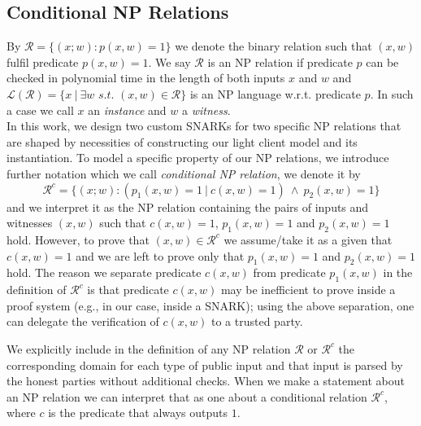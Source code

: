 \subsection{Conditional NP Relations}
\label{sec:conditional_relations}
\noindent By $\mathcal{R} =\{(x;w): p(x,w) = 1 \}$ we denote the binary relation such that $(x,w)$ 
fulfil predicate $p(x,w) = 1$. We say $\mathcal{R}$ is an NP relation if predicate $p$ can be checked in polynomial 
time in the length of both inputs $x$ and $w$ and \\ $\mathcal{L}(\mathcal{R})= \{x \ | \ \exists w \textit{ s.t. } (x,w) \in \mathcal{R} \}$ 
is an NP language w.r.t. predicate $p$. In such a case we call $x$ an \emph{instance} and $w$ a \emph{witness}.  \\

\noindent  In this work, we design two custom SNARKs for two specific NP relations that are shaped by necessities of 
constructing our light client model and its instantiation. To model a specific property of our NP relations, we introduce further 
notation which we call \emph{conditional NP relation}, we denote it by 
$$\mathcal{R}^c = \{(x;w) : (p_1(x,w) =1 \ | \ c(x,w) =1) \ \wedge \ p_2(x,w) = 1 \}$$ and we interpret it as the NP relation containing the pairs of inputs and witnesses 
$(x,w)$ such that $c(x,w) =1$, $p_1(x,w) = 1$ and $p_2(x,w) =1$ hold. However, to prove that $(x,w) \in \mathcal{R}^c$ we assume/take it as a given that 
$c(x,w) =1$ and we are left to prove only that $p_1(x,w) = 1$ and $p_2(x,w) =1$ hold. The reason we separate predicate $c(x,w)$ from predicate $p_1(x,w)$ in the definition 
of $\mathcal{R}^c$ is that predicate $c(x,w)$ may be inefficient to prove inside a proof system (e.g., in our case, inside a SNARK); using the above separation, one can delegate  the verification of $c(x,w)$ to a trusted party.%

\noindent We explicitly include in the definition of any NP relation $\mathcal{R}$ or $\mathcal{R}^c$ the corresponding domain for each type 
of public input and that input is parsed by the honest parties without additional checks. 
When we make a statement about an NP relation we can interpret that as one about a conditional relation $\mathcal{R}^c$, where $c$ is the predicate that always outputs $1$.
\vspace{-0.07in}



